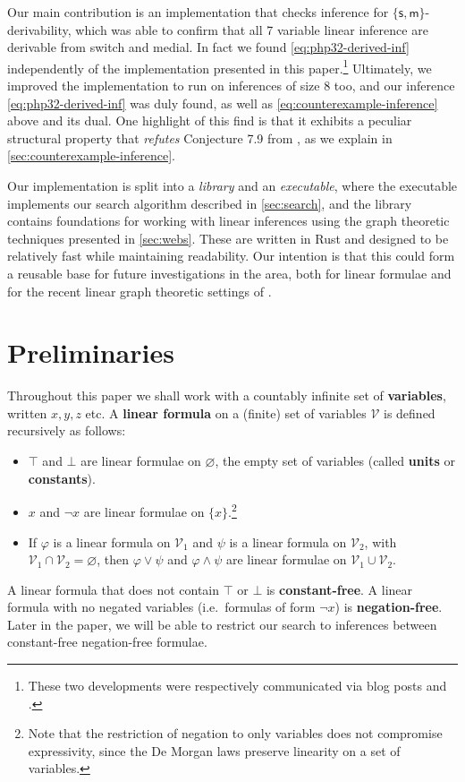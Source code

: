 \documentclass[a4paper, UKenglish, cleveref]{lipics-v2021}
\renewcommand{\phi}{\varphi}
\renewcommand{\emptyset}{\varnothing}
\newcommand{\V}{\ensuremath{\mathcal{V}}}
\newcommand{\m}{\ensuremath{\mathsf{m}}}
\newcommand{\s}{\ensuremath{\mathsf{s}}}
\begin{document}
Our main contribution is an implementation that checks inference for \(\{\s,\m\}\)-derivability, which was able to confirm that all 7 variable linear inference are derivable from switch and medial. In fact we found \eqref{eq:php32-derived-inf} independently of the implementation presented in this paper.\footnote{These two developments were respectively communicated via blog posts \cite{Ric20:lin-inf-size-7} and \cite{Das20:lin-inf-size-8}.}
Ultimately, we improved the implementation to run on inferences of size 8 too,
and our inference \eqref{eq:php32-derived-inf} was duly found, as well as \eqref{eq:counterexample-inference} above and its dual.
One highlight of this find is that it exhibits a peculiar structural property that \emph{refutes} Conjecture 7.9 from \cite{DasStr16:no-compl-lin-sys}, as we explain in \cref{sec:counterexample-inference}.

Our implementation \cite{Ric21:implementation} is split into a \emph{library} and an \emph{executable}, where the executable implements our search algorithm described in \cref{sec:search}, and the library contains foundations for working with linear inferences using the graph theoretic techniques presented in \cref{sec:webs}. These are written in Rust and designed to be relatively fast while maintaining readability.
Our intention is that this could form a reusable base for future investigations in the area, both for linear formulae and for the recent linear graph theoretic settings of \cite{NguSei18:coh-int-graphs,AccHorStr20:mll-graphs-short,AccHorStr20:mll-graphs-full,CalDasWar20:bgl}.

%
%
%
%
%
%
%



\section{Preliminaries}
\label{sec:preliminaries}

Throughout this paper we shall work with a countably infinite set of \textbf{variables}, written $x,y, z$ etc.
A \textbf{linear formula} on a (finite) set of variables \(\V\) is defined recursively as follows:
\begin{itemize}
\item \(\top\) and \(\bot\) are linear formulae on $\emptyset$, the empty set of variables (called \textbf{units} or \textbf{constants}).
\item \(x\) and \(\neg x\) are linear formulae on \(\{x\}\).\footnote{Note that the restriction of negation to only variables does not compromise expressivity, since the De Morgan laws preserve linearity on a set of variables.}
\item If \(\phi\) is a linear formula on \(\V_1\) and \(\psi\) is a linear formula on \(\V_2\), with \(\V_1 \cap \V_2  = \emptyset \), then \(\phi \lor \psi\) and \(\phi \land \psi\) are linear formulae on \(\V_1 \cup \V_2\).
\end{itemize}
A linear formula that does not contain \(\top\) or \(\bot\) is \textbf{constant-free}.
A linear formula with no negated variables (i.e.\ formulas of form $\neg x$) is \textbf{negation-free}. Later in the paper, we will be able to restrict our search to inferences between constant-free negation-free formulae.
\end{document}
